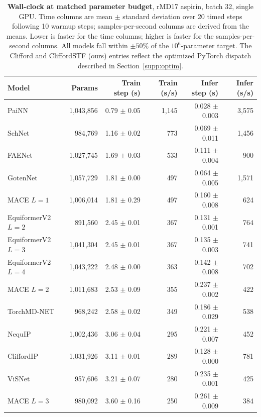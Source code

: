 \begin{table}[!htbp]
\centering
\caption{\textbf{Wall-clock at matched parameter budget}, rMD17 aspirin, batch 32, single GPU. Time columns are mean $\pm$ standard deviation over 20 timed steps following 10 warmup steps; samples-per-second columns are derived from the means. Lower is faster for the time columns; higher is faster for the samples-per-second columns. All models fall within $\pm 50$\% of the $10^6$-parameter target. The Clifford and CliffordSTF (ours) entries reflect the optimized PyTorch dispatch described in Section~\ref{supp:optim}.}
\label{tab:wallclock}
\small
\begin{tabular}{lrrrrr}
\toprule
Model & Params & Train step (s) & Train (s/s) & Infer step (s) & Infer (s/s) \\
\midrule
PaiNN              & 1{,}043{,}856 & 0.79 $\pm$ 0.05 & 1{,}145 & 0.028 $\pm$ 0.003 & 3{,}575 \\
SchNet             &   984{,}769 & 1.16 $\pm$ 0.02 &   773 & 0.069 $\pm$ 0.011 & 1{,}456 \\
FAENet             & 1{,}027{,}745 & 1.69 $\pm$ 0.03 &   533 & 0.111 $\pm$ 0.004 &   900 \\
GotenNet           & 1{,}057{,}729 & 1.81 $\pm$ 0.00 &   497 & 0.064 $\pm$ 0.005 & 1{,}571 \\
MACE $L{=}1$       & 1{,}006{,}014 & 1.81 $\pm$ 0.29 &   497 & 0.160 $\pm$ 0.008 &   624 \\
EquiformerV2 $L{=}2$ &   891{,}560 & 2.45 $\pm$ 0.01 &   367 & 0.131 $\pm$ 0.001 &   764 \\
EquiformerV2 $L{=}3$ & 1{,}041{,}304 & 2.45 $\pm$ 0.01 &   367 & 0.135 $\pm$ 0.003 &   741 \\
EquiformerV2 $L{=}4$ & 1{,}043{,}222 & 2.48 $\pm$ 0.00 &   363 & 0.142 $\pm$ 0.008 &   702 \\
MACE $L{=}2$       & 1{,}011{,}683 & 2.53 $\pm$ 0.09 &   355 & 0.237 $\pm$ 0.002 &   422 \\
TorchMD-NET        &   968{,}242 & 2.58 $\pm$ 0.02 &   349 & 0.186 $\pm$ 0.029 &   538 \\
NequIP             & 1{,}002{,}436 & 3.06 $\pm$ 0.04 &   295 & 0.221 $\pm$ 0.007 &   452 \\
CliffordIP    & 1{,}031{,}926 & 3.11 $\pm$ 0.01 &   289 & 0.128 $\pm$ 0.000 &   781 \\
ViSNet             &   957{,}606 & 3.21 $\pm$ 0.07 &   280 & 0.235 $\pm$ 0.001 &   425 \\
MACE $L{=}3$       &   980{,}092 & 3.60 $\pm$ 0.16 &   250 & 0.261 $\pm$ 0.009 &   384 \\

\end{tabular}
\end{table}
